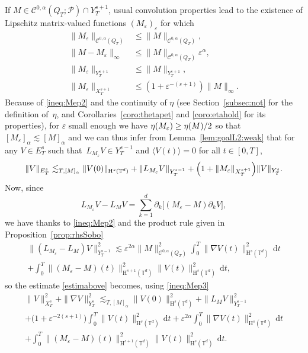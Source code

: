 \documentclass[10pt]{amsart}
\theoremstyle{definition}
\newcommand\T{\mathbb{T}}
\newcommand\dd{\mathrm{d}}
\renewcommand\H{\mathrm{H}}
\let\ep\varepsilon
\begin{document}
If $M\in\mathscr{C}^{0,\alpha}(Q_T;\mathscr{P})\cap Y_T^{s+1}$, usual convolution properties lead to the existence of Lipschitz matrix-valued functions $(M_\ep)_\ep$ for which
\begin{align}
\label{ineq:Mep1}\|M_\ep\|_{\mathscr{C}^{0,\alpha}(Q_T)}&\leq \|M\|_{\mathscr{C}^{0,\alpha}(Q_T)},\\
\label{ineq:Mep2}\|M-M_\ep\|_\infty&\leq \|M\|_{\mathscr{C}^{0,\alpha}(Q_T)}\ep^\alpha,\\
\label{ineq:Mep2bis}\|M_\ep\|_{Y_T^{s+1}}&\leq \|M\|_{Y_T^{s+1}},\\
\label{ineq:Mep3}\|M_\ep\|_{X_T^{s+1}}&\leq (1+\ep^{-(s+1)})\|M\|_{\infty}.
\end{align}
Because of \eqref{ineq:Mep2} and the continuity of $\eta$ (see Section~\ref{subsec:not} for the definition of~$\eta$, and Corollaries~\ref{coro:thetapet} and \ref{coro:etahold} for its properties), for $\ep$ small enough we have $\eta(M_\ep)\geq\nobreak \eta(M)/2$ so that~$[M_\ep]_\alpha\lesssim[M]_\alpha$ and we can thus infer from Lemma~\ref{lem:goalL2:weak} that for any $V\in E_T^s$ such that~$L_{M _\ep}V\in Y_T^{s-1}$ and $\langle V(t)\rangle = 0$ for all $t\in[0,T]$,\vspace*{-3pt}
\begin{equation}\label{estimabove}
\|V\|_{E_T^s} \lesssim_{T,[M]_\alpha} \|V(0)\|_{\H^s(\T^d)} +\| L_{M_\ep }V \|_{Y_T^{s-1}}
+ \Bigl(1+\|M_\ep\|_{X_T^{s+1}}\Bigr)\|V\|_{Y_T^s}.
\end{equation}
Now, since\vspace*{-5pt}
\[
L_{M_\ep }V-L_{M }V = \sum_{k=1}^d \partial_k \bigl[(M_\ep-M)\partial_k V\bigr],
\]
we have thanks to \eqref{ineq:Mep2} and the product rule given in Proposition~\ref{prop:rhsSobo}\vspace*{-5pt}
\begin{multline*}\|(L_{M_\ep}-L_M)V\|_{Y_T^{s-1}}^2 \lesssim \ep^{2\alpha} \|M\|_{\mathscr{C}^{0,\alpha}(Q_T)}^2 \int_0^T \|\nabla V(t)\|_{\H^s(\T^d)}^2\,\dd t \\+ \int_0^T \|(M_\ep-M)(t)\|_{\H^{s+1}(\T^d)}^2\|V(t)\|_{\H^s(\T^d)}^2\,\dd t,\end{multline*} so the estimate \eqref{estimabove} becomes, using \eqref{ineq:Mep3}\vspace*{-5pt}
\begin{multline*}
\|V\|_{X_T^s}^2 + \|\nabla V\|_{Y_T^s}^2 \lesssim_{T,[M]_\alpha} \|V(0)\|_{\H^s(\T^d)}^2+\| L_{M}V \|_{Y_T^{s-1}}^2 \\
+ \bigl(1+ \ep^{-2(s+1)}\bigr)\int_0^T \|V(t)\|_{\H^s(\T^d)}^2\,\dd t +\ep^{2\alpha} \int_0^T \|\nabla V(t)\|_{\H^s(\T^d)}^2\,\dd t \\
+ \int_0^T \|(M_\ep-M)(t)\|_{\H^{s+1}(\T^d)}^2\|V(t)\|_{\H^s(\T^d)}^2\,\dd t.
\end{multline*}
\end{document}
